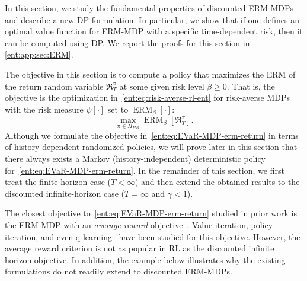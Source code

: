 \documentclass[twoside]{article}
\newcommand{\erm}[2]{\operatorname{ERM}_{#1}\left[#2\right]}
\theoremstyle{plain}
\theoremstyle{definition}
\theoremstyle{remark}
\renewcommand{\cite}[1]{\citep{#1}}
\begin{document}
In this section, we study the fundamental properties of discounted ERM-MDPs and describe a new DP formulation. In particular, we show that if one defines an optimal value function for ERM-MDP with a specific time-dependent risk, then it can be computed using DP. We report the proofs for this section in \cref{ent:app:sec:ERM}.

The objective in this section is to compute a policy that maximizes the ERM of the return random variable $\mathfrak{R}_T^\pi$ at some given risk level $\beta \ge 0$. That is, the objective is the optimization in~\eqref{ent:eq:risk-averse-rl-ent} for risk-averse MDPs with the risk measure $\psi[\cdot]$ set to $\erm{\beta}{\cdot}$:
%
\begin{equation} \label{ent:eq:EVaR-MDP-erm-return}
  \max_{\pi\in\Pi_{HR}}  \erm{\beta}{ \mathfrak{R}_{T}^\pi } .
\end{equation}
%
Although we formulate the objective in~\eqref{ent:eq:EVaR-MDP-erm-return} in terms of history-dependent randomized policies, we will prove later in this section that there always exists a Markov (history-independent) deterministic policy for~\eqref{ent:eq:EVaR-MDP-erm-return}. In the remainder of this section, we first treat the finite-horizon case ($T<\infty$) and then extend the obtained results to the discounted infinite-horizon case ($T=\infty$ and $\gamma < 1$).

The closest objective to~\eqref{ent:eq:EVaR-MDP-erm-return} studied in prior work is the ERM-MDP with an \emph{average-reward} objective~\cite{Borkar2002a}. Value iteration, policy iteration, and even q-learning~\cite{Borkar2002Qrisk} have been studied for this objective. However, the average reward criterion is not as popular in RL as the discounted infinite horizon objective. In addition, the example below illustrates why the existing formulations do not readily extend to discounted ERM-MDPs.
\end{document}
